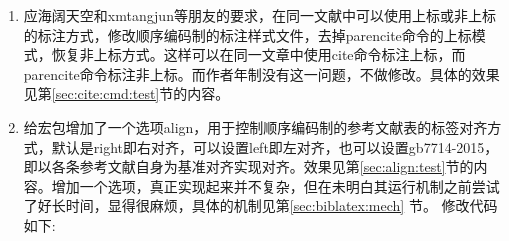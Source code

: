 \label{up:161207}
\begin{enumerate}
\item 应海阔天空和xmtangjun等朋友的要求，在同一文献中可以使用上标或非上标的标注方式，修改顺序编码制的标注样式文件，去掉parencite命令的上标模式，恢复非上标方式。这样可以在同一文章中使用cite命令标注上标，而parencite命令标注非上标。而作者年制没有这一问题，不做修改。具体的效果见第\ref{sec:cite:cmd:test}节的内容。

\item 给宏包增加了一个选项align，用于控制顺序编码制的参考文献表的标签对齐方式，默认是right即右对齐，可以设置left即左对齐，也可以设置gb7714-2015，即以各条参考文献自身为基准对齐实现对齐。效果见第\ref{sec:align:test}节的内容。增加一个选项，真正实现起来并不复杂，但在未明白其运行机制之前尝试了好长时间，显得很麻烦，具体的机制见第\ref{sec:biblatex:mech} 节。
    修改代码如下:



\end{enumerate}
